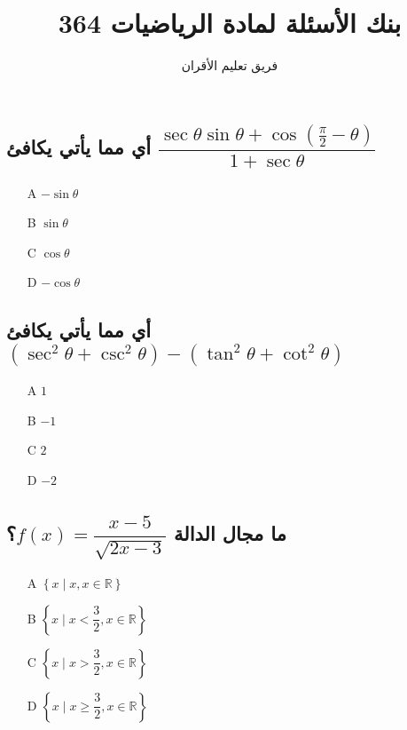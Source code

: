 \documentclass{article}
\title{بنك الأسئلة لمادة الرياضيات 364}
\author{فريق تعليم الأقران}
\begin{document}
\maketitle

\subsection*{أي مما يأتي يكافئ $\dfrac{\sec\theta\sin\theta + \cos\left(\frac{\pi}{2} - \theta\right)}{1 + \sec\theta}$}
\begin{enumerate}
    \item[A] $-\sin\theta$
    \item[B] $\sin\theta$
    \item[C] $\cos\theta$
    \item[D] $-\cos\theta$
\end{enumerate}

\subsection*{أي مما يأتي يكافئ $\left(\sec ^2 \theta+\csc ^2 \theta\right)-\left(\tan ^2 \theta+\cot ^2 \theta\right)$}

\begin{enumerate}
    \item[A] $1$
    \item[B] $-1$
    \item[C] $2$
    \item[D] $-2$
\end{enumerate}

\subsection*{ما مجال الدالة $f(x) = \dfrac{x - 5}{\sqrt{2x-3}}$؟}
\begin{enumerate}
    \item[A] $\left\{x \mid x, x \in \mathbb{R}\right\}$
    \item[B] $\left\{x \mid x < \dfrac{3}{2}, x \in \mathbb{R}\right\}$
    \item[C] $\left\{x \mid x > \dfrac{3}{2}, x \in \mathbb{R}\right\}$
    \item[D] $\left\{x \mid x \geq \dfrac{3}{2}, x \in \mathbb{R}\right\}$
\end{enumerate}
\end{document}
